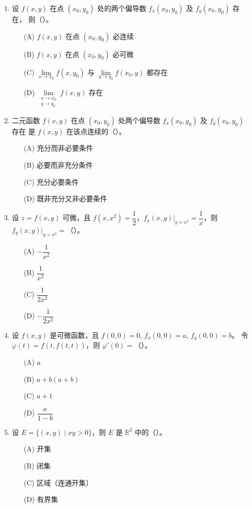 \documentclass[lang=cn,11pt]{elegantbook}
\begin{document}
\begin{exercise}
\begin{enumerate}
  \item 设 $f(x,y)$ 在点 $(x_0,y_0)$ 处的两个偏导数 $f_x(x_0,y_0)$ 及 $f_y(x_0,y_0)$ 存在，
        则（\qquad）。
    \begin{enumerate}
      \item[(A)] $f(x,y)$ 在点 $(x_0,y_0)$ 必连续
      \item[(B)] $f(x,y)$ 在点 $(x_0,y_0)$ 必可微
      \item[(C)] $\lim\limits_{x\to x_0}f(x,y_0)$ 与 $\lim\limits_{y\to y_0}f(x_0,y)$ 都存在
      \item[(D)] $\lim\limits_{\substack{x\to x_0 \\ y\to y_0}}f(x,y)$ 存在
    \end{enumerate}

  \item 二元函数 $f(x,y)$ 在点 $(x_0,y_0)$ 处两个偏导数 $f_x(x_0,y_0)$ 及 $f_y(x_0,y_0)$ 存在
        是 $f(x,y)$ 在该点连续的（\qquad）。
    \begin{enumerate}
      \item[(A)] 充分而非必要条件
      \item[(B)] 必要而非充分条件
      \item[(C)] 充分必要条件
      \item[(D)] 既非充分又非必要条件
    \end{enumerate}

  \item 设 $z=f(x,y)$ 可微，且 $f(x,x^2)=\dfrac{1}{2}$，$f_x(x,y)\big|_{y=x^2}=\dfrac{1}{x}$，则 $f_y(x,y)\big|_{y=x^2}=$（\qquad）。
    \begin{enumerate}
      \item[(A)] $-\dfrac{1}{x^2}$
      \item[(B)] $\dfrac{1}{x^2}$
      \item[(C)] $\dfrac{1}{2x^2}$
      \item[(D)] $-\dfrac{1}{2x^2}$
    \end{enumerate}

  \item 设 $f(x,y)$ 是可微函数，且 $f(0,0)=0$, $f_x(0,0)=a$, $f_y(0,0)=b$。
        令 $\varphi(t)=f(t,f(t,t))$，则 $\varphi'(0)=$（\qquad）。
    \begin{enumerate}
      \item[(A)] $a$
      \item[(B)] $a+b(a+b)$
      \item[(C)] $a+1$
      \item[(D)] $\dfrac{a}{1-b}$
    \end{enumerate}

  \item 设 $E=\{(x,y)\mid xy>0\}$，则 $E$ 是 $\mathbb R^2$ 中的（\qquad）。
    \begin{enumerate}
      \item[(A)] 开集
      \item[(B)] 闭集
      \item[(C)] 区域（连通开集）
      \item[(D)] 有界集
    \end{enumerate}
\end{enumerate}
\end{exercise}
\end{document}
